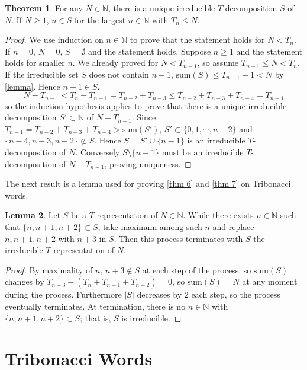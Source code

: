 \documentclass{article}
\theoremstyle{definition}
\newtheorem{theorem}{Theorem}
\newtheorem{lemma}[theorem]{Lemma}
\begin{document}
\begin{theorem}
\label{thm 1} For any $N\in \mathbb{N}$, there is a unique irreducible $T$-decomposition $S$ of $N$. If $N\geq 1$, $n\in S$ for the largest $n\in \mathbb{N}$ with $T_n \leq N$.
\end{theorem}

\begin{proof}
We use induction on $n\in\mathbb{N}$ to prove that the statement holds for $N<T_{n}$. If $n=0$, $N=0$, $S=\emptyset$ and the statement holds. Suppose $n\geq 1$ and the statement holds for smaller $n$. We already proved for $N<T_{n-1}$, so assume $T_{n-1}\leq N<T_n$. If the irreducible set $S$ does not contain $n-1$, $\text{sum}(S)\leq T_{n-1}-1<N$ by \cref{lemma}. Hence $n-1\in S$.
\[
N-T_{n-1}<T_n-T_{n-1}=T_{n-2}+T_{n-3}\leq T_{n-2}+T_{n-3}+T_{n-4}=T_{n-1}
\]
so the induction hypothesis applies to prove that there is a unique irreducible decomposition $S'\subset\mathbb{N}$ of $N-T_{n-1}$. Since $T_{n-1}=T_{n-2}+T_{n-3}+T_{n-4}>\text{sum}(S')$, $S'\subset\{0,1,\cdots,n-2\}$ and $\{n-4, n-3, n-2\}\not\subset S$. Hence $S=S'\cup\{n-1\}$ is an irreducible $T$-decomposition of $N$. Conversely $S\setminus\{n-1\}$ must be an irreducible $T$-decomposition of $N-T_{n-1}$, proving uniqueness.  
\end{proof}

The next result is a lemma used for proving \cref{thm 6} and \cref{thm 7} on Tribonacci words.

\begin{lemma}
\label{thm 2}
Let \( S \) be a \( T \)-representation of \( N \in \mathbb{N} \).  
While there exists \( n \in \mathbb{N} \) such that \( \{n, n+1, n+2\} \subset S \), take maximum among such $n$ and replace $ n, n+1, n+2  $ with \( n+3 \) in \( S \).  
Then this process terminates with \( S \) the irreducible \( T \)-representation of \( N \).
\end{lemma}

\begin{proof}
By maximality of $n$, $n+3\notin S$ at each step of the process, so $\text{sum}(S)$ changes by $T_{n+3}-(T_n+T_{n+1}+T_{n+2})=0$, so $\text{sum}(S)=N$ at any moment during the process. Furthermore $|S|$ decreases by $2$ each step, so the process eventually terminates. At termination, there is no $n\in\mathbb{N}$ with $\{n,n+1,n+2\}\subset S$; that is, $S$ is irreducible.
\end{proof}

\section{Tribonacci Words}
\end{document}
